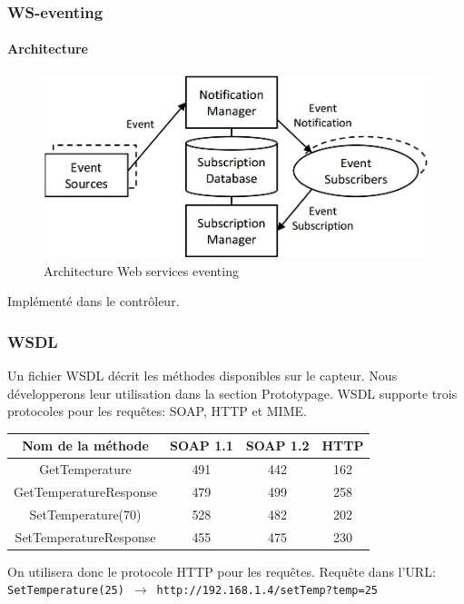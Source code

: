 \begin{frame}
 \frametitle{WS-eventing}
 \framesubtitle{Architecture}
 \begin{figure}
  \centering
  \includegraphics[scale=0.43]{figures/eventing.jpg}
  \caption{Architecture Web services eventing}
 \end{figure}
 Implémenté dans le contrôleur.
\end{frame}
\begin{frame}
 \frametitle{WSDL}
 Un fichier WSDL décrit les méthodes disponibles sur le capteur. Nous développerons leur utilisation dans la section Prototypage.
 WSDL supporte trois protocoles pour les requêtes: SOAP, HTTP et MIME.\\
 \vspace{3mm}
 \begin{center}
 \begin{tabular}{|c|c|c|c|}
 \hline
 Nom de la méthode & SOAP 1.1 & SOAP 1.2 & HTTP\\
 \hline
 GetTemperature & 491 & 442 & 162\\
 GetTemperatureResponse & 479 & 499 & 258\\
 SetTemperature(70) & 528 & 482 & 202\\
 SetTemperatureResponse & 455 & 475 & 230\\
 \hline
 \end{tabular}
 \end{center}
 \vspace{3mm}
 On utilisera donc le protocole HTTP pour les requêtes. Requête dans l'URL:\\
 \texttt{SetTemperature(25)}~$\rightarrow$~\texttt{http://192.168.1.4/setTemp?temp=25}
\end{frame}
